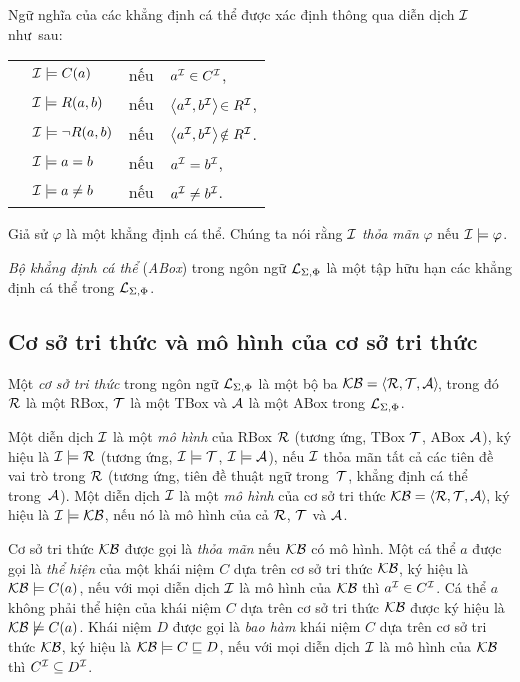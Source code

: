 Ngữ nghĩa của các khẳng định cá thể được xác định thông qua diễn dịch $\mathcal{I}$ như~sau:\\[1.5ex]
\begin{tabular}{c l c l}
	& $\mathcal{I} \models C(a)$      & nếu & $a^{\mathcal{I}} \in C^{\mathcal{I}}$, \\[0.5ex] 
	& $\mathcal{I} \models R(a,b)$    & nếu & $\left\langle a^{\mathcal{I}},b^{\mathcal{I}}\right\rangle\! \in R^{\mathcal{I}}$,\\[0.5ex]
	& $\mathcal{I} \models \neg R(a,b)$ & nếu & $\left\langle a^{\mathcal{I}},b^{\mathcal{I}}\right\rangle\! \notin R^{\mathcal{I}}$.\\[0.5ex]
	& $\mathcal{I} \models a = b$     & nếu & $a^{\mathcal{I}} = b^{\mathcal{I}}$, \\[0.5ex]
	& $\mathcal{I} \models a \neq b$  & nếu & $a^{\mathcal{I}} \neq b^{\mathcal{I}}$.
\end{tabular}

Giả sử $\varphi$ là một khẳng định cá thể. Chúng ta nói rằng $\mathcal{I}$ {\em thỏa mãn} $\varphi$ nếu $\mathcal{I} \models \varphi$.

\begin{Definition}
\label{def:ABox}
{\em Bộ khẳng định cá thể} ({\em ABox}) trong ngôn ngữ $\mathcal{L}_{\Sigma,\Phi}$ là một tập hữu hạn các khẳng định cá thể trong $\mathcal{L}_{\Sigma,\Phi}$.\myend
\end{Definition}

\subsection{Cơ sở tri thức và mô hình của cơ sở tri thức}
\label{sec:Chap1.KnowledgeBase}

\begin{Definition}
Một {\em cơ sở tri thức} trong ngôn ngữ $\mathcal{L}_{\Sigma,\Phi}$ là một bộ ba \mbox{$\mathcal{KB} = \left\langle\mathcal{R}, \mathcal{T}, \mathcal{A}\right\rangle\!$}, trong đó $\mathcal{R}$ là một RBox, $\mathcal{T}$ là một TBox và $\mathcal{A}$ là một ABox trong $\mathcal{L}_{\Sigma,\Phi}$.\myend
\end{Definition}

\begin{Definition}[Mô hình]
Một diễn dịch $\mathcal{I}$ là một {\em mô hình} của RBox $\mathcal{R}$ (tương ứng, TBox $\mathcal{T}$, ABox $\mathcal{A}$), ký hiệu là $\mathcal{I} \models \mathcal{R}$ (tương ứng, $\mathcal{I} \models \mathcal{T}$, $\mathcal{I} \models \mathcal{A}$), nếu $\mathcal{I}$ thỏa mãn tất cả các tiên đề vai trò trong $\mathcal{R}$ (tương ứng, tiên đề thuật ngữ trong~$\mathcal{T}$, khẳng định cá thể trong~$\mathcal{A}$).
Một diễn dịch $\mathcal{I}$ là một {\em mô hình} của cơ sở tri thức $\mathcal{KB}=\left\langle\mathcal{R},\mathcal{T}, \mathcal{A}\right\rangle\!$, ký hiệu là $\mathcal{I} \models \mathcal{KB}$, nếu nó là mô hình của cả $\mathcal{R}$, $\mathcal{T}$ và $\mathcal{A}$.\myend
\end{Definition}

Cơ sở tri thức $\mathcal{KB}$ được gọi là {\em thỏa mãn} nếu $\mathcal{KB}$ có mô hình. 
Một cá thể $a$ được gọi là {\em thể hiện} của một khái niệm $C$ dựa trên cơ sở tri thức $\mathcal{KB}$, ký hiệu là $\mathcal{KB} \models C(a)$, nếu với mọi diễn dịch $\mathcal{I}$ là mô hình của $\mathcal{KB}$ thì $a^{\mathcal{I}} \in C^{\mathcal{I}}$. Cá thể $a$ không phải thể hiện của khái niệm $C$ dựa trên cơ sở tri thức $\mathcal{KB}$ được ký hiệu là $\mathcal{KB} \not \models C(a)$.
%
Khái niệm $D$ được gọi là {\em bao hàm} khái niệm $C$ dựa trên cơ sở tri thức $\mathcal{KB}$, ký hiệu là $\mathcal{KB} \models C \sqsubseteq D$, nếu với mọi diễn dịch $\mathcal{I}$ là mô hình của $\mathcal{KB}$ thì $C^{\mathcal{I}} \subseteq D^{\mathcal{I}}$.

